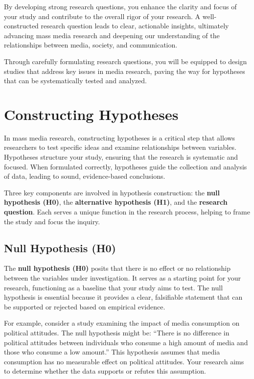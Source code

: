 \documentclass[
]{book}
\begin{document}
By developing strong research questions, you enhance the clarity and focus of your study and contribute to the overall rigor of your research. A well-constructed research question leads to clear, actionable insights, ultimately advancing mass media research and deepening our understanding of the relationships between media, society, and communication.

Through carefully formulating research questions, you will be equipped to design studies that address key issues in media research, paving the way for hypotheses that can be systematically tested and analyzed.

\section{Constructing Hypotheses}\label{constructing-hypotheses}

In mass media research, constructing hypotheses is a critical step that allows researchers to test specific ideas and examine relationships between variables. Hypotheses structure your study, ensuring that the research is systematic and focused. When formulated correctly, hypotheses guide the collection and analysis of data, leading to sound, evidence-based conclusions.

Three key components are involved in hypothesis construction: the \textbf{null hypothesis (H0)}, the \textbf{alternative hypothesis (H1)}, and the \textbf{research question}. Each serves a unique function in the research process, helping to frame the study and focus the inquiry.

\subsection*{Null Hypothesis (H0)}\label{null-hypothesis-h0}

The \textbf{null hypothesis (H0)} posits that there is no effect or no relationship between the variables under investigation. It serves as a starting point for your research, functioning as a baseline that your study aims to test. The null hypothesis is essential because it provides a clear, falsifiable statement that can be supported or rejected based on empirical evidence.

For example, consider a study examining the impact of media consumption on political attitudes. The null hypothesis might be: ``There is no difference in political attitudes between individuals who consume a high amount of media and those who consume a low amount.'' This hypothesis assumes that media consumption has no measurable effect on political attitudes. Your research aims to determine whether the data supports or refutes this assumption.
\end{document}
